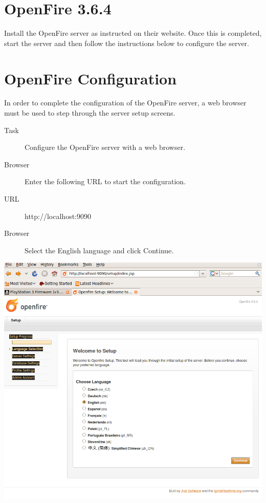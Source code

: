\section{OpenFire 3.6.4}
Install the OpenFire server as instructed on their website. Once this is completed,
start the server and then follow the instructions below to configure the server.


\section{OpenFire Configuration}
In order to complete the configuration of the OpenFire server, a web browser must be
used to step through the server setup screens.

\begin{description}
 \item [Task] Configure the OpenFire server with a web browser.
 \item [Browser] Enter the following URL to start the configuration.
 \item [URL] http://localhost:9090
\end{description}

\begin{description}
\item [Browser] Select the English language and click Continue.
\end{description}
\begin{center}
\includegraphics[scale=0.5]{figs/deploy/openfire-1.png} 
\end{center}

